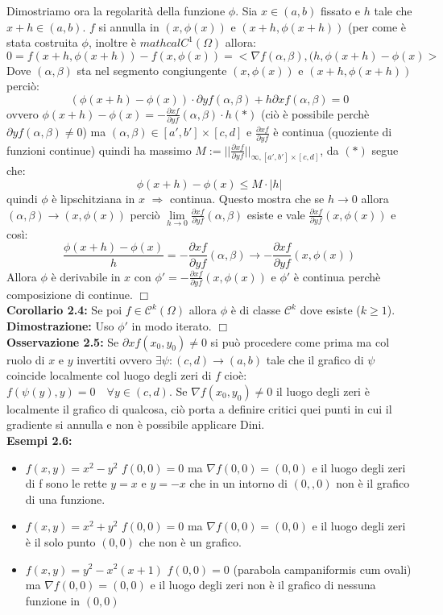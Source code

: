 \documentclass[a4paper,11pt,titlepage]{book}
\begin{document}
Dimostriamo ora la regolarità della funzione $\phi$. Sia $x\in(a,b)$ fissato e $h$ tale che $x+h\in(a,b)$. $f$ si annulla in $(x,\phi(x))$ e $(x+h,\phi(x+h))$ (per come è stata costruita $\phi$, inoltre è $mathcal{C}^1(\Omega)$ allora: $$0=f(x+h,\phi(x+h))-f(x,\phi(x))=< \nabla f(\alpha,\beta),(h,\phi(x+h)-\phi(x)>$$ Dove $(\alpha,\beta)$ sta nel segmento congiungente $(x,\phi(x))$ e $(x+h,\phi(x+h))$ perciò: $$(\phi(x+h)-\phi(x))\cdot\partial y f(\alpha,\beta)+h\partial x f(\alpha,\beta)=0$$ ovvero $\phi(x+h)-\phi(x)=-\frac{\partial x f}{\partial y f}(\alpha,\beta)\cdot h (*)$ (ciò è possibile perchè $\partial y f(\alpha,\beta)\ne 0$) ma $(\alpha,\beta)\in[a',b']\times[c,d]$ e $\frac{\partial x f}{\partial y f}$ è continua (quoziente di funzioni continue) quindi ha massimo $M:=||\frac{\partial x f}{\partial y f}||_{\infty,[a',b']\times[c,d]}$, da $(*)$ segue che: $$\phi(x+h)-\phi(x)\leq M\cdot |h|$$
quindi $\phi$ è lipschitziana in $x$ $\Rightarrow$ continua. Questo mostra che se $h\to 0$ allora $(\alpha,\beta)\to(x,\phi(x))$ perciò $\lim\limits_{h\to 0}\frac{\partial x f}{\partial y f}(\alpha,\beta)$ esiste e vale $\frac{\partial x f}{\partial y f}(x,\phi(x))$ e così: $$\frac{\phi(x+h)-\phi(x)}{h}=-\frac{\partial x f}{\partial y f}(\alpha,\beta)\to -\frac{\partial x f}{\partial y f}(x,\phi(x))$$ Allora $\phi$ è derivabile in $x$ con $\phi '=-\frac{\partial x f}{\partial y f}(x,\phi(x))$ e $\phi '$ è continua perchè composizione di continue. $\Box$\\

\textbf{Corollario 2.4:} Se poi $f\in\mathcal{C}^k(\Omega)$ allora $\phi$ è di classe $\mathcal{C}^k$ dove esiste ($k\geq 1$).\\

\textbf{Dimostrazione:} Uso $\phi '$ in modo iterato. $\Box$ \\

\textbf{Osservazione 2.5:} Se $\partial x f(x_0,y_0)\ne 0$ si può procedere come prima ma col ruolo di $x$ e $y$ invertiti ovvero $\exists\psi:(c,d)\to(a,b)$ tale che il grafico di $\psi$ coincide localmente col luogo degli zeri di $f$ cioè: $f(\psi(y),y)=0\quad\forall y\in (c,d)$. Se $\nabla f(x_0,y_0)\ne 0$ il luogo degli zeri è localmente il grafico di qualcosa, ciò porta a definire critici quei punti in cui il gradiente si annulla e non è possibile applicare Dini.\\

\textbf{Esempi 2.6:}\begin{itemize}
\item $f(x,y)=x^2-y^2$ $f(0,0)=0$ ma $\nabla f(0,0)=(0,0)$ e il luogo degli zeri di f sono le rette $y=x$ e $y=-x$ che in un intorno di $(0,,0)$ non è il grafico di una funzione.
\item $f(x,y)=x^2+y^2$ $f(0,0)=0$ ma $\nabla f(0,0)=(0,0)$ e il luogo degli zeri è il solo punto $(0,0)$ che non è un grafico.
\item $f(x,y)=y^2-x^2(x+1)$ $f(0,0)=0$ (parabola campaniformis cum ovali) ma $\nabla f(0,0)=(0,0)$ e il luogo degli zeri non è il grafico di nessuna funzione in $(0,0)$
\end{itemize}
\end{document}
